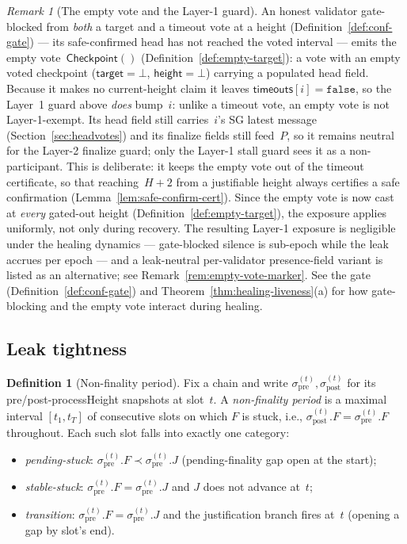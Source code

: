 \ifx\litemode\undefined\documentclass{article}\fi
\newcommand{\target}{\mathsf{target}}
\newcommand{\height}{\mathsf{height}}
\newcommand{\timeouts}{\mathsf{timeouts}}
\newcommand{\processHeight}{\textsf{processHeight}\xspace}
\newcommand{\emptyckpt}{\ensuremath{\mathsf{Checkpoint}()}} %
\theoremstyle{plain}
\theoremstyle{definition}
\newtheorem{definition}{Definition}
\theoremstyle{remark}
\newtheorem{remark}[theorem]{Remark}
\begin{document}
\begin{remark}[The empty vote and the Layer-1 guard]\label{rem:empty-vote-leak}
An honest validator gate-blocked from \emph{both} a target and a timeout vote at a height (Definition~\ref{def:conf-gate}) --- its safe-confirmed head has not reached the voted interval --- emits the empty vote~$\emptyckpt$ (Definition~\ref{def:empty-target}): a vote with an empty voted checkpoint ($\target = \bot$, $\height = \bot$) carrying a populated head field.
Because it makes no current-height claim it leaves $\timeouts[i] = \mathtt{false}$, so the Layer~1 guard above \emph{does} bump~$i$: unlike a timeout vote, an empty vote is not Layer-1-exempt.
Its head field still carries~$i$'s SG latest message (Section~\ref{sec:headvotes}) and its finalize fields still feed~$P$, so it remains neutral for the Layer-2 finalize guard; only the Layer-1 stall guard sees it as a non-participant.
This is deliberate: it keeps the empty vote out of the timeout certificate, so that reaching~$H+2$ from a justifiable height always certifies a safe confirmation (Lemma~\ref{lem:safe-confirm-cert}).
Since the empty vote is now cast at \emph{every} gated-out height (Definition~\ref{def:empty-target}), the exposure applies uniformly, not only during recovery.
The resulting Layer-1 exposure is negligible under the healing dynamics --- gate-blocked silence is sub-epoch while the leak accrues per epoch --- and a leak-neutral per-validator presence-field variant is listed as an alternative; see Remark~\ref{rem:empty-vote-marker}.
See the gate (Definition~\ref{def:conf-gate}) and Theorem~\ref{thm:healing-liveness}(a) for how gate-blocking and the empty vote interact during healing.
\end{remark}

\subsection{Leak tightness}

\begin{definition}[Non-finality period]\label{def:non-finality-period}
Fix a chain and write $\sigma_{\mathrm{pre}}^{(t)}, \sigma_{\mathrm{post}}^{(t)}$ for its pre/post-\processHeight snapshots at slot~$t$.
A \emph{non-finality period} is a maximal interval $[t_1, t_T]$ of consecutive slots on which $F$ is stuck, i.e., $\sigma_{\mathrm{post}}^{(t)}.F = \sigma_{\mathrm{pre}}^{(t)}.F$ throughout.
Each such slot falls into exactly one category:
\begin{itemize}
  \item \emph{pending-stuck}: $\sigma_{\mathrm{pre}}^{(t)}.F \prec \sigma_{\mathrm{pre}}^{(t)}.J$ (pending-finality gap open at the start);
  \item \emph{stable-stuck}: $\sigma_{\mathrm{pre}}^{(t)}.F = \sigma_{\mathrm{pre}}^{(t)}.J$ and $J$ does not advance at~$t$;
  \item \emph{transition}: $\sigma_{\mathrm{pre}}^{(t)}.F = \sigma_{\mathrm{pre}}^{(t)}.J$ and the justification branch fires at~$t$ (opening a gap by slot's end).
\end{itemize}
\end{definition}
\end{document}
